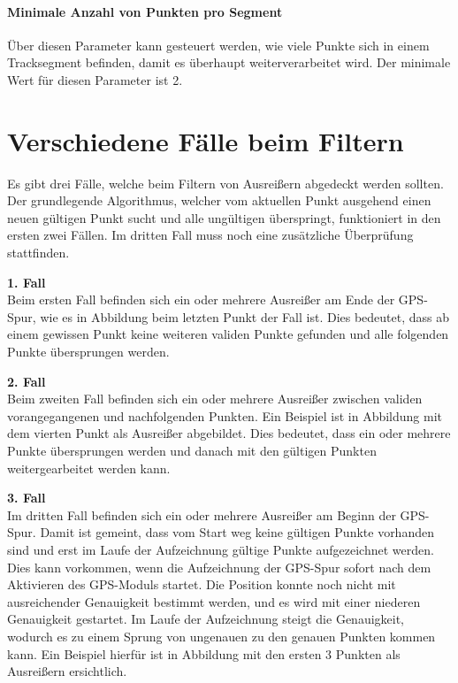 \paragraph{Minimale Anzahl von Punkten pro Segment} Über diesen Parameter kann gesteuert werden, wie viele Punkte sich in einem Tracksegment befinden, damit es überhaupt weiterverarbeitet wird. Der minimale Wert für diesen Parameter ist 2. 

\section*{Verschiedene Fälle beim Filtern}
Es gibt drei Fälle, welche beim Filtern von Ausreißern abgedeckt werden sollten. Der grundlegende Algorithmus, welcher vom aktuellen Punkt ausgehend einen neuen gültigen Punkt sucht und alle ungültigen überspringt, funktioniert in den ersten zwei Fällen. Im dritten Fall muss noch eine zusätzliche Überprüfung stattfinden.

\textbf{1. Fall}\\
Beim ersten Fall befinden sich ein oder mehrere Ausreißer am Ende der GPS-Spur, wie es in Abbildung  beim letzten Punkt der Fall ist. Dies bedeutet, dass ab einem gewissen Punkt keine weiteren validen Punkte gefunden und alle folgenden Punkte übersprungen werden.


\textbf{2. Fall}\\
Beim zweiten Fall befinden sich ein oder mehrere Ausreißer zwischen validen vorangegangenen und nachfolgenden Punkten. Ein Beispiel ist in Abbildung  mit dem vierten Punkt als Ausreißer abgebildet. Dies bedeutet, dass ein oder mehrere Punkte übersprungen werden und danach mit den gültigen Punkten weitergearbeitet werden kann.


\textbf{3. Fall}\\
Im dritten Fall befinden sich ein oder mehrere Ausreißer am Beginn der GPS-Spur. Damit ist gemeint, dass vom Start weg keine gültigen Punkte vorhanden sind und erst im Laufe der Aufzeichnung gültige Punkte aufgezeichnet werden. Dies kann vorkommen, wenn die Aufzeichnung der GPS-Spur sofort nach dem Aktivieren des GPS-Moduls startet. Die Position konnte noch nicht mit ausreichender Genauigkeit bestimmt werden, und es wird mit einer niederen Genauigkeit gestartet. Im Laufe der Aufzeichnung steigt die Genauigkeit, wodurch es zu einem Sprung von ungenauen zu den genauen Punkten kommen kann. Ein Beispiel hierfür ist in Abbildung  mit den ersten 3 Punkten als Ausreißern ersichtlich.

